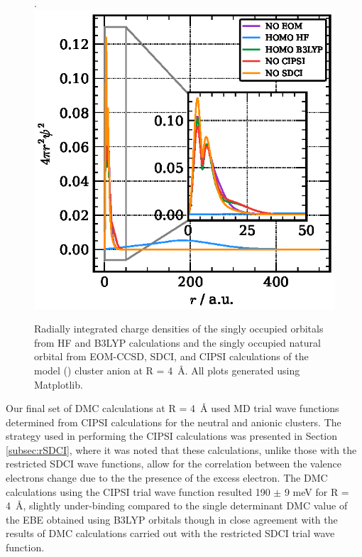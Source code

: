 \begin{figure}
    \caption{\label{fig:orbitalsR4} Radially integrated charge densities of the singly occupied orbitals from HF and B3LYP calculations and the singly occupied natural orbital from EOM-CCSD, SDCI, and CIPSI calculations  of the model () cluster anion at R = \SI{4}{\angstrom}. All plots generated using Matplotlib.\cite{matplotlib}}.
    \includegraphics[width=\columnwidth,keepaspectratio]{Images/chapter3/r4_orbitalr2.eps}
\end{figure}


Our final set of DMC calculations at R = \SI{4}{\angstrom} used MD trial wave functions determined from CIPSI calculations for the neutral and anionic clusters. 
The strategy used in performing the CIPSI calculations was presented in Section \ref{subsec:rSDCI}, where it was noted that these calculations, unlike those with the restricted SDCI wave functions, allow for the correlation between the valence electrons change due to the the presence of the excess electron. 
The DMC calculations using the CIPSI trial wave function resulted 190 $\pm$ 9 meV for R = \SI{4}{\angstrom}, slightly under-binding compared to the single determinant DMC value of the EBE obtained using B3LYP orbitals though in close agreement with the results of DMC calculations carried out with the restricted SDCI trial wave function.

